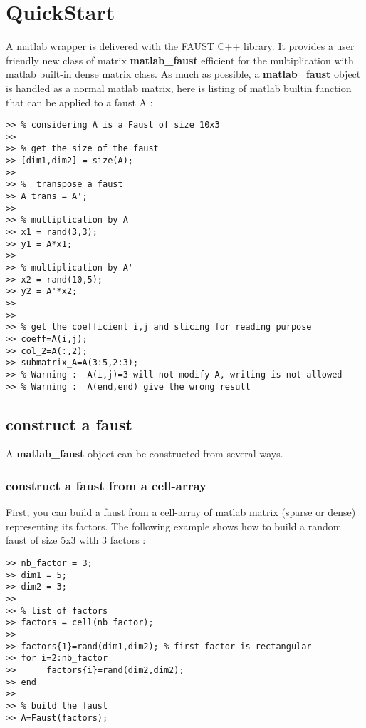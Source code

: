 \chapter{QuickStart}\label{sec:firstUse}


A matlab wrapper is delivered with the FAUST C++ library.
It provides a user friendly new class of matrix \textbf{matlab{\_}faust} efficient for the multiplication with matlab built-in dense matrix class.\newline
\newline
As much as possible, a \textbf{matlab{\_}faust} object is handled as a normal matlab matrix, here is listing of matlab builtin function that can be applied to a faust A :



\begin{lstlisting}
>> % considering A is a Faust of size 10x3
>>
>> % get the size of the faust
>> [dim1,dim2] = size(A);
>>
>> %  transpose a faust  
>> A_trans = A'; 		 
>> 
>> % multiplication by A
>> x1 = rand(3,3);
>> y1 = A*x1;  
>> 
>> % multiplication by A'
>> x2 = rand(10,5);
>> y2 = A'*x2;
>>
>>
>> % get the coefficient i,j and slicing for reading purpose
>> coeff=A(i,j);
>> col_2=A(:,2);
>> submatrix_A=A(3:5,2:3);
>> % Warning :  A(i,j)=3 will not modify A, writing is not allowed
>> % Warning :  A(end,end) give the wrong result   
\end{lstlisting}



\section{construct a faust}\label{sec:firstUseBuild}

A \textbf{matlab{\_}faust} object can be constructed from several ways.
\subsection{construct a faust from a cell-array}\label{sec:firstUseBuildFromCellArray}
First, you can build a faust from a cell-array of matlab matrix (sparse or dense) representing its factors.
\newline
\newline
The following example shows how to build a random faust of size 5x3 with 3 factors :
\begin{lstlisting}
>> nb_factor = 3;
>> dim1 = 5;
>> dim2 = 3; 
>>
>> % list of factors
>> factors = cell(nb_factor);
>>
>> factors{1}=rand(dim1,dim2); % first factor is rectangular 
>> for i=2:nb_factor
>> 		factors{i}=rand(dim2,dim2);
>> end
>>
>> % build the faust
>> A=Faust(factors);
\end{lstlisting}
\newpage

